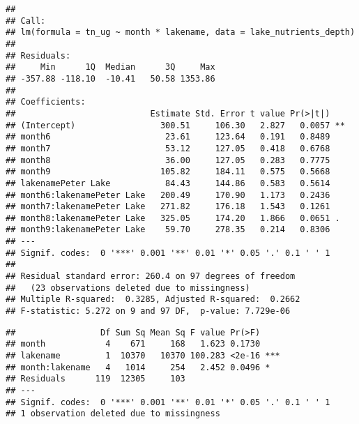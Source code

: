 \documentclass[]{article}
\newenvironment{Shaded}{\begin{snugshade}}{\end{snugshade}}
\newcommand{\CommentTok}[1]{\textcolor[rgb]{0.56,0.35,0.01}{\textit{#1}}}
\newcommand{\DataTypeTok}[1]{\textcolor[rgb]{0.13,0.29,0.53}{#1}}
\newcommand{\KeywordTok}[1]{\textcolor[rgb]{0.13,0.29,0.53}{\textbf{#1}}}
\newcommand{\NormalTok}[1]{#1}
\newcommand{\OperatorTok}[1]{\textcolor[rgb]{0.81,0.36,0.00}{\textbf{#1}}}
\newcommand{\StringTok}[1]{\textcolor[rgb]{0.31,0.60,0.02}{#1}}
\begin{document}
\begin{verbatim}
## 
## Call:
## lm(formula = tn_ug ~ month * lakename, data = lake_nutrients_depth)
## 
## Residuals:
##     Min      1Q  Median      3Q     Max 
## -357.88 -118.10  -10.41   50.58 1353.86 
## 
## Coefficients:
##                           Estimate Std. Error t value Pr(>|t|)   
## (Intercept)                 300.51     106.30   2.827   0.0057 **
## month6                       23.61     123.64   0.191   0.8489   
## month7                       53.12     127.05   0.418   0.6768   
## month8                       36.00     127.05   0.283   0.7775   
## month9                      105.82     184.11   0.575   0.5668   
## lakenamePeter Lake           84.43     144.86   0.583   0.5614   
## month6:lakenamePeter Lake   200.49     170.90   1.173   0.2436   
## month7:lakenamePeter Lake   271.82     176.18   1.543   0.1261   
## month8:lakenamePeter Lake   325.05     174.20   1.866   0.0651 . 
## month9:lakenamePeter Lake    59.70     278.35   0.214   0.8306   
## ---
## Signif. codes:  0 '***' 0.001 '**' 0.01 '*' 0.05 '.' 0.1 ' ' 1
## 
## Residual standard error: 260.4 on 97 degrees of freedom
##   (23 observations deleted due to missingness)
## Multiple R-squared:  0.3285, Adjusted R-squared:  0.2662 
## F-statistic: 5.272 on 9 and 97 DF,  p-value: 7.729e-06
\end{verbatim}

\begin{Shaded}
\end{Shaded}

\begin{verbatim}
##                 Df Sum Sq Mean Sq F value Pr(>F)    
## month            4    671     168   1.623 0.1730    
## lakename         1  10370   10370 100.283 <2e-16 ***
## month:lakename   4   1014     254   2.452 0.0496 *  
## Residuals      119  12305     103                   
## ---
## Signif. codes:  0 '***' 0.001 '**' 0.01 '*' 0.05 '.' 0.1 ' ' 1
## 1 observation deleted due to missingness
\end{verbatim}
\end{document}
